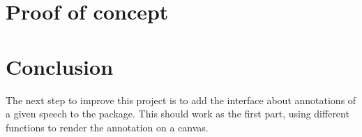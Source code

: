 \documentclass{article}
\begin{document}
\section{Proof of concept}

\section*{Conclusion}

The next step to improve this project is to add the interface about annotations of a given speech to the package. This should work as the first part, using different functions to render the annotation on a canvas. 
\end{document}
